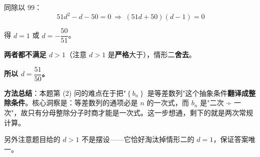 \begin{answer}
同除以 $99$：
\nopagebreak[4]
\[51d^{2}-d-50=0\ \Longrightarrow\ (51d+50)(d-1)=0\]

得 $d=1$ 或 $d=-\dfrac{50}{51}$。

\textbf{两者都不满足 $d>1$}（注意 $d>1$ 是\textbf{严格}大于），情形二\textbf{舍去}。

\textbf{所以 $d=\dfrac{51}{50}$。}

\begin{gktip}
\textbf{方法总结}：本题第 (2) 问的难点在于把"$\left\{b_n\right\}$ 是等差数列"这个抽象条件\textbf{翻译成整除条件}。核心洞察是：等差数列的通项必是 $n$ 的一次式，而 $b_n$ 是"二次 ÷ 一次"，故只有分母整除分子时商才能是一次式。这一步想通，剩下的就是两次常规计算。

另外注意题目给的 $d>1$ 不是摆设——它恰好淘汰掉情形二的 $d=1$，保证答案唯一。
\end{gktip}



\par\medskip

\end{answer}
